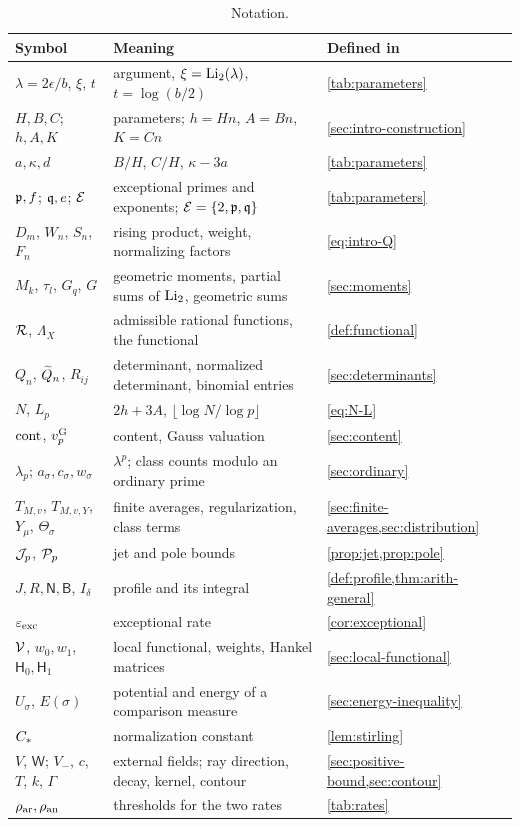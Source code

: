 \begin{table}[ht]
\centering
\caption{Notation.}
\small
\label{tab:notation}
\small
\begin{tabular}{@{}>{\raggedright\arraybackslash}p{}>{\raggedright\arraybackslash}p{}>{\raggedright\arraybackslash}p{}@{}}
\toprule
Symbol & Meaning & Defined in\\
\midrule
$\lambda=2\epsilon/b$, $\xi$, $t$ & argument, $\xi=\operatorname{Li}_2(\lambda)$, $t=\log(b/2)$ & \cref{tab:parameters}\\
$H,B,C$; $h,A,K$ & parameters; $h=Hn$, $A=Bn$, $K=Cn$ & \cref{sec:intro-construction}\\
$a,\kappa,d$ & $B/H$, $C/H$, $\kappa-3a$ & \cref{tab:parameters}\\
$\mathfrak{p},f$; $\mathfrak{q},e$; $\mathcal{E}$ & exceptional primes and exponents; $\mathcal{E}=\{2,\mathfrak{p},\mathfrak{q}\}$ & \cref{tab:parameters}\\
$D_m$, $W_n$, $S_n$, $F_n$ & rising product, weight, normalizing factors & \eqref{eq:intro-Q}\\
$M_k$, $\tau_l$, $G_q$, $G$ & geometric moments, partial sums of $\operatorname{Li}_2$, geometric sums & \cref{sec:moments}\\
$\mathcal{R}$, $\Lambda_X$ & admissible rational functions, the functional & \cref{def:functional}\\
$Q_n$, $\widetilde{Q}_n$, $R_{ij}$ & determinant, normalized determinant, binomial entries & \cref{sec:determinants}\\
$N$, $L_p$ & $2h+3A$, $\lfloor\log N/\log p\rfloor$ & \eqref{eq:N-L}\\
$\operatorname{cont}$, $v^{\mathrm{G}}_{p}$ & content, Gauss valuation & \cref{sec:content}\\
$\lambda_p$; $a_\sigma,c_\sigma,w_\sigma$ & $\lambda^p$; class counts modulo an ordinary prime & \cref{sec:ordinary}\\
$T_{M,v}$, $T_{M,v,Y}$, $Y_\mu$, $\Theta_\sigma$ & finite averages, regularization, class terms & \cref{sec:finite-averages,sec:distribution}\\
$\mathcal{J}_p$, $\mathcal{P}_p$ & jet and pole bounds & \cref{prop:jet,prop:pole}\\
$J,R,\mathsf N,\mathsf B$, $I_\delta$ & profile and its integral & \cref{def:profile,thm:arith-general}\\
$\varepsilon_{\mathrm{exc}}$ & exceptional rate & \cref{cor:exceptional}\\
$\mathcal{V}$, $w_0,w_1$, $\mathsf H_0,\mathsf H_1$ & local functional, weights, Hankel matrices & \cref{sec:local-functional}\\
$U_\sigma$, $E(\sigma)$ & potential and energy of a comparison measure & \cref{sec:energy-inequality}\\
$C_{*}$ & normalization constant & \cref{lem:stirling}\\
$V$, $\mathsf W$; $V_-$, $c$, $T$, $k$, $\Gamma$ & external fields; ray direction, decay, kernel, contour & \cref{sec:positive-bound,sec:contour}\\
$\rho_{\mathrm{ar}},\rho_{\mathrm{an}}$ & thresholds for the two rates & \cref{tab:rates}\\
\bottomrule
\end{tabular}
\end{table}
